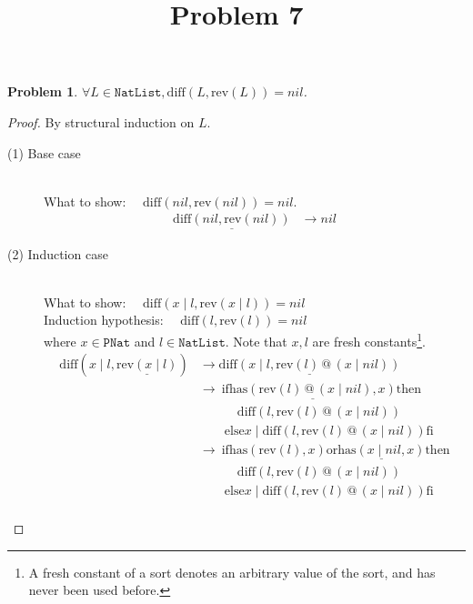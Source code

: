 \documentclass[12pt, a4paper]{article}
\title{Problem 7}
\date{\vspace{-5ex}}
\newtheorem{problem}{Problem}
\newcommand{\rel}[1]{\mathrel{#1}}
\newcommand{\rmx}[1]{\mathrm{#1}}
\newcommand{\larrow}{\longrightarrow}
\newcommand{\under}{\underline}
\begin{document}
\maketitle

\begin{problem}
$\forall L \in \mathtt{NatList}, \rmx{diff}(L, \rmx{rev}(L)) = nil$.
\end{problem}
\begin{proof}
By structural induction on $L$.

\begin{description}
\item[(1) Base case]~\\
\noindent
What to show: $\quad \rmx{diff}(nil, \rmx{rev}(nil)) = nil$.
\begin{align*}
\under{\rmx{diff}(nil, \rmx{rev}(nil))}
	&\larrow nil \tag{by diff1}
\end{align*}
\item[(2) Induction case]~\\
What to show: $\quad \rmx{diff}(x \rel{|} l, \rmx{rev}(x \rel{|} l)) = nil$ \\
Induction hypothesis: $\quad \rmx{diff}(l, \rmx{rev}(l)) = nil$  \\
where $x \in \mathtt{PNat}$ and $l \in \mathtt{NatList}$.
Note that $x, l$ are fresh constants\footnote{A fresh constant of a sort denotes an arbitrary value of the sort, and has never been used before.}.
\begin{align*}
\rmx{diff}(x \rel{|} l, \under{\rmx{rev}(x \rel{|} l)})
	&\larrow \under{\rmx{diff}(x \rel{|} l, \rmx{rev}(l) \rel{@} (x \rel{|} nil))} \tag{by rev2} \\
	&\larrow\ \rel{\rmx{if}} \under{\rmx{has}(\rmx{rev}(l) \rel{@} (x \rel{|} nil), x)} \rel{\rmx{then}} \\
	&\quad \quad \quad \rmx{diff}(l, \rmx{rev}(l) \rel{@} (x \rel{|} nil)) \\
	&\quad \quad \rel{\rmx{else}} x \rel{|} \rmx{diff}(l, \rmx{rev}(l) \rel{@}(x \rel{|} nil)) \rel{\rmx{fi}} \tag{by diff2} \\
	&\larrow\ \rel{\rmx{if}} \rmx{has}(\rmx{rev}(l), x) \rel{\rmx{or}} \under{\rmx{has}(x \rel{|} nil, x)} \rel{\rmx{then}} \\
	&\quad \quad \quad \rmx{diff}(l, \rmx{rev}(l) \rel{@} (x \rel{|} nil)) \\
	&\quad \quad \rel{\rmx{else}} x \rel{|} \rmx{diff}(l, \rmx{rev}(l) \rel{@}(x \rel{|} nil)) \rel{\rmx{fi}} \tag{by Lemma 1 from Problem 6} \\	

\end{align*}
\end{description}
\end{proof}
\end{document}
